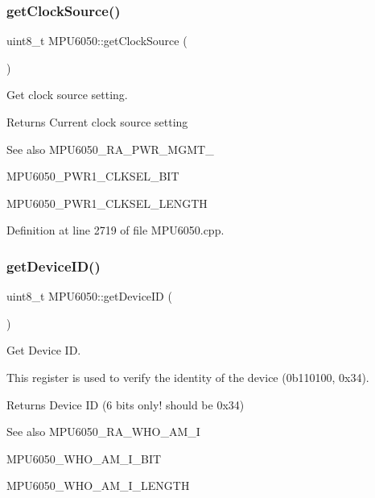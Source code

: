 \subsubsection{\texorpdfstring{getClockSource()}{getClockSource()}}
{\footnotesize\ttfamily uint8\+\_\+t M\+P\+U6050\+::get\+Clock\+Source (\begin{DoxyParamCaption}{ }\end{DoxyParamCaption})}



Get clock source setting. 

\begin{DoxyReturn}{Returns}
Current clock source setting 
\end{DoxyReturn}
\begin{DoxySeeAlso}{See also}
M\+P\+U6050\+\_\+\+R\+A\+\_\+\+P\+W\+R\+\_\+\+M\+G\+M\+T\+\_ 

M\+P\+U6050\+\_\+\+P\+W\+R1\+\_\+\+C\+L\+K\+S\+E\+L\+\_\+\+B\+IT 

M\+P\+U6050\+\_\+\+P\+W\+R1\+\_\+\+C\+L\+K\+S\+E\+L\+\_\+\+L\+E\+N\+G\+TH 
\end{DoxySeeAlso}


Definition at line 2719 of file M\+P\+U6050.\+cpp.

\mbox{\label{classMPU6050_a35ae3c8894b3258e642043886801e031}} 
\subsubsection{\texorpdfstring{getDeviceID()}{getDeviceID()}}
{\footnotesize\ttfamily uint8\+\_\+t M\+P\+U6050\+::get\+Device\+ID (\begin{DoxyParamCaption}{ }\end{DoxyParamCaption})}



Get Device ID. 

This register is used to verify the identity of the device (0b110100, 0x34). \begin{DoxyReturn}{Returns}
Device ID (6 bits only! should be 0x34) 
\end{DoxyReturn}
\begin{DoxySeeAlso}{See also}
M\+P\+U6050\+\_\+\+R\+A\+\_\+\+W\+H\+O\+\_\+\+A\+M\+\_\+I 

M\+P\+U6050\+\_\+\+W\+H\+O\+\_\+\+A\+M\+\_\+\+I\+\_\+\+B\+IT 

M\+P\+U6050\+\_\+\+W\+H\+O\+\_\+\+A\+M\+\_\+\+I\+\_\+\+L\+E\+N\+G\+TH 
\end{DoxySeeAlso}


